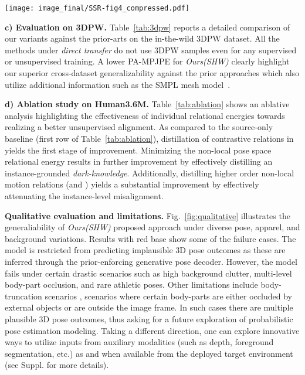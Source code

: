 \documentclass{article}
\begin{document}
\begin{figure*}[t!]  \begin{center}
\texttt{[image: image\_final/SSR-fig4\_compressed.pdf]}
	\vspace{-1mm}
	\caption{
	Predictions obtained via \textit{Ours(SHW)} generalize well to both in-studio and in-the-wild datasets. The failure cases (rare poses or poses with inter-limb occlusion) are highlighted by results on red bases. }
    \vspace{-6mm}
    \label{fig:qualitative}  
\end{center}
\end{figure*}



\noindent
\textbf{c) Evaluation on 3DPW.}\hspace{1mm}
Table~\ref{tab:3dpw} reports a detailed comparison of our variants against the prior-arts on the in-the-wild 3DPW dataset. All the methods under \textit{direct transfer} do not use 3DPW samples even for any supervised or unsupervised training. A lower PA-MPJPE for \textit{Ours(SHW)} clearly highlight our superior cross-dataset generalizability against the prior approaches which also utilize additional information such as the SMPL mesh model~\cite{loper2015smpl}.


\textbf{d) Ablation study on Human3.6M.}\hspace{1mm}
Table~\ref{tab:ablation} shows an ablative analysis highlighting the effectiveness of individual relational energies towards realizing a better unsupervised alignment. As compared to the source-only baseline (first row of Table~\ref{tab:ablation}), distillation of contrastive relations in  yields the first stage of improvement. Minimizing the non-local pose space relational energy  results in further improvement by effectively distilling an instance-grounded \textit{dark-knowledge}. Additionally, distilling higher order non-local motion relations (\ie  and ) yields a substantial improvement by effectively attenuating the instance-level misalignment.

\textbf{Qualitative evaluation and limitations.}
Fig.~\ref{fig:qualitative} illustrates the generaliability of \textit{Ours(SHW)} proposed approach under diverse pose, apparel, and background variations. Results with red base show some of the failure cases. 
The model is restricted from predicting implausible 3D pose outcomes as these are inferred through the prior-enforcing generative pose decoder. However, the model fails under certain drastic scenarios such as high background clutter, multi-level body-part occlusion, and rare athletic poses. Other limitations include body-truncation scenarios \ie, scenarios where certain body-parts are either occluded by external objects or are outside the image frame. In such cases there are multiple plausible 3D pose outcomes, thus asking for a future exploration of probabilistic pose estimation modeling. Taking a different direction, one can explore innovative  ways to utilize inputs from auxiliary modalities (such as depth, foreground segmentation, etc.) as and when available from the deployed target environment (see Suppl. for more details).
\end{document}
